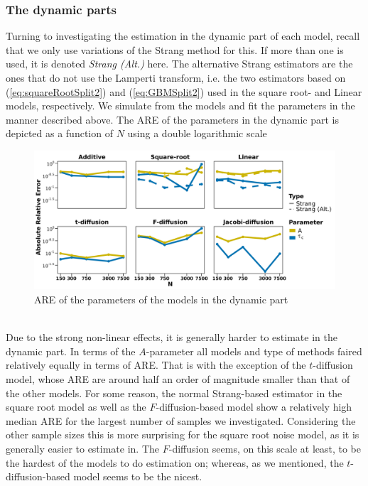 \subsubsection{The dynamic parts}
Turning to investigating the estimation in the dynamic part of each model, recall that we only use variations of the Strang method for this. If more than one is used, it is denoted \textit{Strang (Alt.)} here. The alternative Strang estimators are the ones that do not use the Lamperti transform, i.e. the two estimators based on (\ref{eq:squareRootSplit2}) and (\ref{eq:GBMSplit2}) used in the square root- and Linear models, respectively. We simulate from the models and fit the parameters in the manner described above. The ARE of the parameters in the dynamic part is depicted as a function of $N$ using a double logarithmic scale 
\begin{figure}[h!]
    \begin{center}
    \includegraphics[scale = .1]{figures/parameter_precision_dynamic.jpeg}
    \caption{ARE of the parameters of the models in the dynamic part}
    \label{figure:parameter_precision_dynamic}        
\end{center}
\end{figure}\\
Due to the strong non-linear effects, it is generally harder to estimate in the dynamic part. In terms of the $A$-parameter all models and type of methods faired relatively equally in terms of ARE. That is with the exception of the $t$-diffusion model, whose ARE are around half an order of magnitude smaller than that of the other models. For some reason, the normal Strang-based estimator in the square root model as well as the $F$-diffusion-based model show a relatively high median ARE for the largest number of samples we investigated.  Considering the other sample sizes this is more surprising for the square root noise model, as it is generally easier to estimate in. The $F$-diffusion seems, on this scale at least, to be the hardest of the models to do estimation on; whereas, as we mentioned, the $t$-diffusion-based model seems to be the nicest. 

